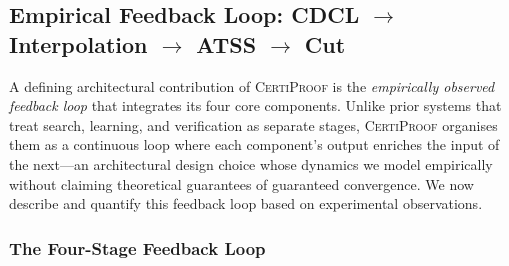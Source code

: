 \documentclass[acmtocl,review,anonymous]{acmart}
\newcommand{\CP}{\textsc{CertiProof}}
\begin{document}
\subsection{Empirical Feedback Loop: CDCL $\to$ Interpolation $\to$ ATSS $\to$ Cut}
\label{sec:feedback-loop}

A defining architectural contribution of \CP{} is the \emph{empirically observed
feedback loop} that integrates its four core components.  Unlike prior systems
that treat search, learning, and verification as separate stages, \CP{} organises
them as a continuous loop where each component's output enriches the input of
the next---an architectural design choice whose dynamics we model empirically
without claiming theoretical guarantees of guaranteed convergence.  We now
describe and quantify this feedback loop based on experimental observations.

\subsubsection*{The Four-Stage Feedback Loop}
\end{document}
